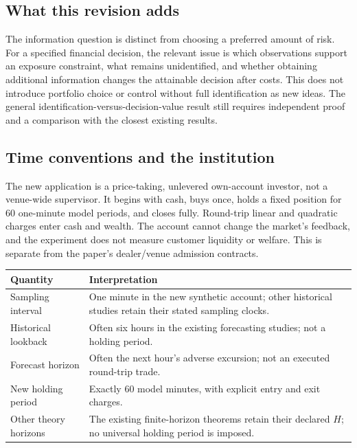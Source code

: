 \documentclass[12pt]{article}
\theoremstyle{definition}
\theoremstyle{remark}
\begin{document}
\subsection*{What this revision adds}
The information question is distinct from choosing a preferred amount of risk.
For a specified financial decision, the relevant issue is which observations
support an exposure constraint, what remains unidentified, and whether obtaining
additional information changes the attainable decision after costs. This does
not introduce portfolio choice or control without full identification as new
ideas. The general identification-versus-decision-value result still requires
independent proof and a comparison with the closest existing results.

\subsection*{Time conventions and the institution}
The new application is a price-taking, unlevered own-account investor, not a
venue-wide supervisor. It begins with cash, buys once, holds a fixed position
for 60 one-minute model periods, and closes fully. Round-trip linear and
quadratic charges enter cash and wealth. The account cannot change the market's
feedback, and the experiment does not measure customer liquidity or welfare.
This is separate from the paper's dealer/venue admission contracts.

\begin{center}\small
\begin{tabular}{p{}p{}}
\toprule
Quantity & Interpretation\\
\midrule
Sampling interval & One minute in the new synthetic account; other historical studies retain their stated sampling clocks.\\
Historical lookback & Often six hours in the existing forecasting studies; not a holding period.\\
Forecast horizon & Often the next hour's adverse excursion; not an executed round-trip trade.\\
New holding period & Exactly 60 model minutes, with explicit entry and exit charges.\\
Other theory horizons & The existing finite-horizon theorems retain their declared $H$; no universal holding period is imposed.\\
\bottomrule
\end{tabular}
\end{center}
\end{document}
